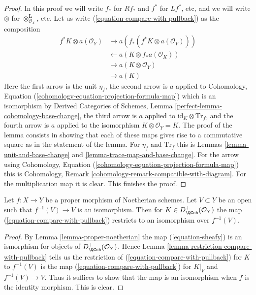 \begin{proof}
In this proof we will write $f_*$ for $Rf_*$ and $f^*$ for $Lf^*$, etc,
and we will write $\otimes$ for $\otimes^\mathbf{L}_{\mathcal{O}_X}$, etc.
Let us write (\ref{equation-compare-with-pullback}) as the composition
\begin{align*}
f^*K \otimes a(\mathcal{O}_Y)
& \to
a(f_*(f^*K \otimes a(\mathcal{O}_Y))) \\
& \leftarrow
a(K \otimes f_*a(\mathcal{O}_K)) \\
& \to
a(K \otimes \mathcal{O}_Y) \\
& \to
a(K)
\end{align*}
Here the first arrow is the unit $\eta_f$, the second arrow is $a$
applied to Cohomology, Equation
(\ref{cohomology-equation-projection-formula-map}) which is an
isomorphism by Derived Categories of Schemes, Lemma
\ref{perfect-lemma-cohomology-base-change}, the third arrow is
$a$ applied to $\text{id}_K \otimes \text{Tr}_f$, and the fourth
arrow is $a$ applied to the isomorphism $K \otimes \mathcal{O}_Y = K$.
The proof of the lemma consists in showing that each of these
maps gives rise to a commutative square as in the statement of the lemma.
For $\eta_f$ and $\text{Tr}_f$ this is
Lemmas \ref{lemma-unit-and-base-change} and
\ref{lemma-trace-map-and-base-change}.
For the arrow using Cohomology, Equation
(\ref{cohomology-equation-projection-formula-map})
this is Cohomology, Remark \ref{cohomology-remark-compatible-with-diagram}.
For the multiplication map it is clear. This finishes the proof.
\end{proof}

\begin{lemma}
\label{lemma-compare-on-open}
Let $f : X \to Y$ be a proper morphism of Noetherian schemes. Let $V \subset Y$
be an open such that $f^{-1}(V) \to V$ is an isomorphism. Then for
$K \in D_\QCoh^+(\mathcal{O}_Y)$ the map (\ref{equation-compare-with-pullback})
restricts to an isomorphism over $f^{-1}(V)$.
\end{lemma}

\begin{proof}
By Lemma \ref{lemma-proper-noetherian} the map (\ref{equation-sheafy}) is an
ismorphism for objects of $D_\QCoh^+(\mathcal{O}_Y)$. Hence
Lemma \ref{lemma-restriction-compare-with-pullback} tells us the
restriction of (\ref{equation-compare-with-pullback}) for $K$
to $f^{-1}(V)$ is the map (\ref{equation-compare-with-pullback})
for $K|_V$ and $f^{-1}(V) \to V$. Thus it suffices to show that
the map is an isomorphism when $f$ is the identity morphism. This is clear.
\end{proof}

